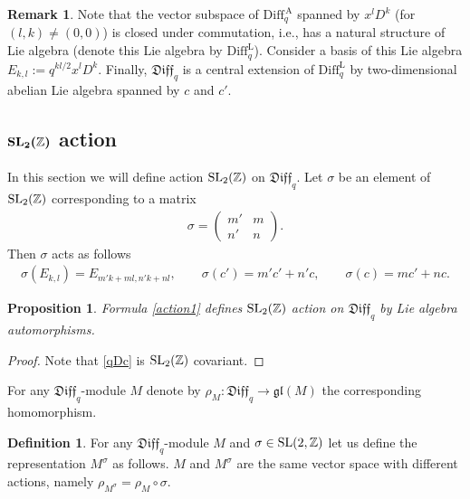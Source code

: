 \documentclass[pdftex]{sigma}
\numberwithin{equation}{section}
\newtheorem{Proposition}[Theorem]{Proposition}
\theoremstyle{definition}
\newtheorem{Remark}[Theorem]{Remark}
\newtheorem{Definition}[Theorem]{Definition}
\newcommand{\qaD}{\mathrm{Diff}_q^{\, \mathrm{A}}}
\newcommand{\qD}{\mathfrak{Diff}_q}
\begin{document}
\begin{Remark}Note that the vector subspace of $\qaD$ spanned by $x^l D^k$ (for $(l,k) \neq (0,0)$) is closed under commutation, i.e., has a natural structure of Lie algebra (denote this Lie algebra by $\mathrm{Diff}_q^{\mathrm{L}}$). Consider a basis of this Lie algebra $E_{k,l} := q^{kl/2} x^l D^k$. Finally, $\qD$ is a central extension of $\mathrm{Diff}_q^{\mathrm{L}}$ by two-dimensional abelian Lie algebra spanned by $c$ and $c'$.
\end{Remark}

\subsection[${\rm SL}_2(\mathbb{Z} )$ action]{$\boldsymbol{{\rm SL}_2(\mathbb{Z} )}$ action}

In this section we will define action ${\rm SL}_2 ( \mathbb{Z} )$ on $\qD$. Let $\sigma$ be an element of ${\rm SL}_2 ( \mathbb{Z} )$ corresponding to a matrix
\begin{gather*}
\sigma = \begin{pmatrix}
m' & m \\
n' & n
\end{pmatrix}. %
\end{gather*}
Then $\sigma$ acts as follows
\begin{gather} \label{action1}
\sigma( E_{k,l} ) = E_{ m' k + m l, n' k + n l }, \qquad
\sigma (c') = m' c' + n' c, \qquad \sigma (c) = m c' + n c.
\end{gather}

\begin{Proposition} Formula \eqref{action1} defines ${\rm SL}_2 ( \mathbb{Z} )$ action on $\qD$ by Lie algebra automorphisms.
\end{Proposition}
\begin{proof} Note that \eqref{qDc} is ${\rm SL}_2 ( \mathbb{Z} )$ covariant. \end{proof}

For any $\qD$-module $M$ denote by $\rho_{M} \colon \qD \rightarrow \mathfrak{gl} (M)$ the corresponding homomorphism.

\begin{Definition} \label{twisted} For any $\qD$-module $M$ and $\sigma \in {\rm SL}(2,\mathbb{Z})$ let us define the representation $M^\sigma$ as follows. $M$ and $M^{\sigma}$ are the same vector space with different actions, namely $\rho_{M^{\sigma}} = \rho_M \circ \sigma$.
\end{Definition}
\end{document}
